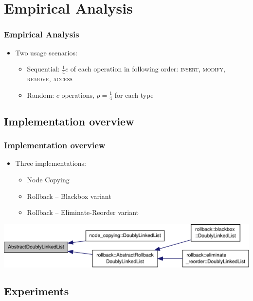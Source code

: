 \documentclass{beamer}
\begin{document}
\section{Empirical Analysis}

\begin{frame}
\frametitle{Empirical Analysis}
\begin{itemize}
  \item Two usage scenarios:
  \begin{itemize}

    \item Sequential: $\frac{1}{4}c$ of each operation in following
    order:\newline\hphantom{Sequential: } \textsc{insert}, \textsc{modify},
    \textsc{remove}, \textsc{access}

    \item Random: $c$ operations, $p=\frac{1}{4}$ for each type
  \end{itemize}

\end{itemize}
\end{frame}

\subsection{Implementation overview}

\begin{frame}
\frametitle{Implementation overview}
\begin{itemize}
  \item Three implementations:

  \begin{itemize}
    \item Node Copying
    \item Rollback -- Blackbox variant
    \item Rollback -- Eliminate-Reorder variant
  \end{itemize}
\end{itemize}
\includegraphics[width=\textwidth]{figures/classAbstractDoublyLinkedList__inherit__graph.pdf}
\end{frame}

\subsection{Experiments}
\end{document}
